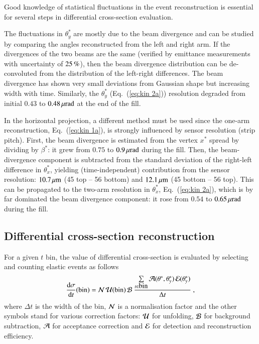 Good knowledge of statistical fluctuations in the event reconstruction is essential for several steps in differential cross-section evaluation.

The fluctuations in $\theta_y^*$ are mostly due to the beam divergence and can be studied by comparing the angles reconstructed from the left and right arm. If the divergences of the two beams are the same (verified by emittance measurements with uncertainty of $25\,{\rm \%}$), then the beam divergence distribution can be de-convoluted from the distribution of the left-right differences. The beam divergence has shown very small deviations from Gaussian shape but increasing width with time. Similarly, the $\theta_y^*$ (Eq.~(\ref{eq:kin 2a})) resolution degraded from initial $0.43$ to $0.48\,{\rm \mu rad}$ at the end of the fill.

In the horizontal projection, a different method must be used since the one-arm reconstruction, Eq.~(\ref{eq:kin 1a}), is strongly influenced by sensor resolution (strip pitch). First, the beam divergence is estimated from the vertex $x^*$ spread by dividing by $\beta^*$: it grew from $0.75$ to $0.9\,{\rm \mu rad}$ during the fill. Then, the beam-divergence component is subtracted from the standard deviation of the right-left difference in $\theta_x^*$, yielding (time-independent) contribution from the sensor resolution: $10.7\,{\rm \mu m}$ (45 top -- 56 bottom) and $12.1\,{\rm \mu m}$ (45 bottom -- 56 top). This can be propagated to the two-arm resolution in $\theta_x^*$, Eq.~({\ref{eq:kin 2a}}), which is by far dominated the beam divergence component: it rose from $0.54$ to $0.65\,{\rm \mu rad}$ during the fill. 


\subsection{Differential cross-section reconstruction}

For a given $t$ bin, the value of differential cross-section is evaluated by selecting and counting elastic events as follows
\begin{equation}
{\d\sigma\over \d t}(\hbox{bin}) =
	{\cal N}\, {\cal U}({\rm bin})\, {\cal B}\ 
	{\sum\limits_{t \in \hbox{bin}} {\cal A}(\theta^*, \theta_y^*)\, {\cal E}(\theta_y^*)\over \Delta t}\ ,
\end{equation}
where $\Delta t$ is the width of the bin, ${\cal N}$ is a normalisation factor and the other symbols stand for various correction factors:
 ${\cal U}$ for unfolding, ${\cal B}$ for background subtraction, ${\cal A}$ for acceptance correction and ${\cal E}$ for detection and reconstruction efficiency.

